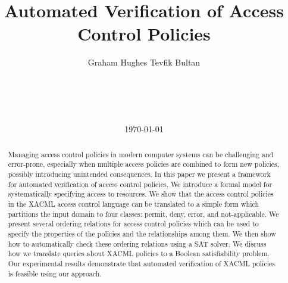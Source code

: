 \documentclass{acm_proc_article-sp}
\begin{document}
\title{Automated Verification of Access Control Policies}
\author{
\alignauthor Graham Hughes \quad Tevfik Bultan \\
       \\
       \\
       \\
       \\
}
\date\today
\maketitle

\begin{abstract}
  Managing access control policies in modern computer systems can be
  challenging and error-prone, especially when multiple access
  policies are combined to form new policies, possibly introducing
  unintended consequences.  In this paper we present a framework for
  automated verification of access control policies.  We introduce a
  formal model for systematically specifying access to resources.  We
  show that the access control policies in the XACML access control
  language can be translated to a simple form which partitions the
  input domain to four classes: permit, deny, error, and
  not-applicable.  We present several ordering relations for access
  control policies which can be used to specify the properties of
  the policies and the relationships among them.  We then show how to
  automatically check these ordering relations using a SAT solver.
  We discuss how we translate queries about XACML policies to a Boolean
  satisfiability problem.
  Our experimental results demonstrate that automated
  verification of XACML policies is feasible using our approach.
\end{abstract}









\end{document}
